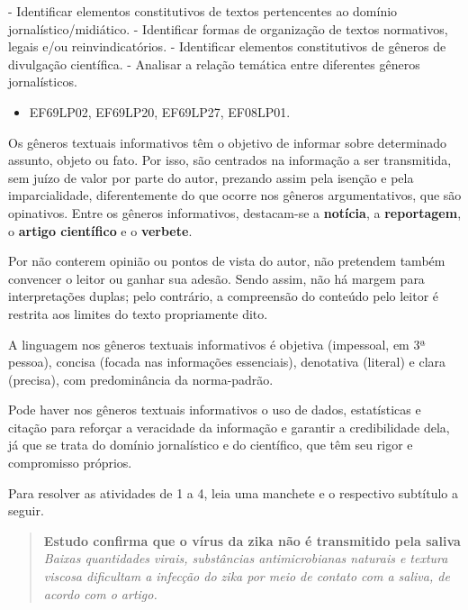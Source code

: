 - Identificar elementos constitutivos de
textos pertencentes ao domínio jornalístico/midiático. - Identificar
formas de organização de textos normativos, legais e/ou
reinvindicatórios. - Identificar elementos constitutivos de gêneros de
divulgação científica. - Analisar a relação temática entre diferentes
gêneros jornalísticos.


\begin{itemize}
\tightlist
\item
  EF69LP02, EF69LP20, EF69LP27, EF08LP01.
\end{itemize}

Os gêneros textuais informativos têm o objetivo de informar sobre
determinado assunto, objeto ou fato. Por isso, são centrados na
informação a ser transmitida, sem juízo de valor por parte do autor,
prezando assim pela isenção e pela imparcialidade, diferentemente do que
ocorre nos gêneros argumentativos, que são opinativos. Entre os gêneros
informativos, destacam-se a \textbf{notícia}, a \textbf{reportagem}, o
\textbf{artigo científico} e o \textbf{verbete}.

Por não conterem opinião ou pontos de vista do autor, não pretendem
também convencer o leitor ou ganhar sua adesão. Sendo assim, não há
margem para interpretações duplas; pelo contrário, a compreensão do
conteúdo pelo leitor é restrita aos limites do texto propriamente dito.

A linguagem nos gêneros textuais informativos é objetiva (impessoal, em
3ª pessoa), concisa (focada nas informações essenciais), denotativa
(literal) e clara (precisa), com predominância da norma-padrão.

Pode haver nos gêneros textuais informativos o uso de dados,
estatísticas e citação para reforçar a veracidade da informação e
garantir a credibilidade dela, já que se trata do domínio jornalístico e
do científico, que têm seu rigor e compromisso próprios.


Para resolver as atividades de 1 a 4, leia uma manchete e o respectivo
subtítulo a seguir.

\begin{quote}
\textbf{Estudo confirma que o vírus da zika não é transmitido pela
saliva} \emph{Baixas quantidades virais, substâncias antimicrobianas
naturais e textura viscosa dificultam a infecção do zika por meio de
contato com a saliva, de acordo com o artigo.}
\end{quote}

